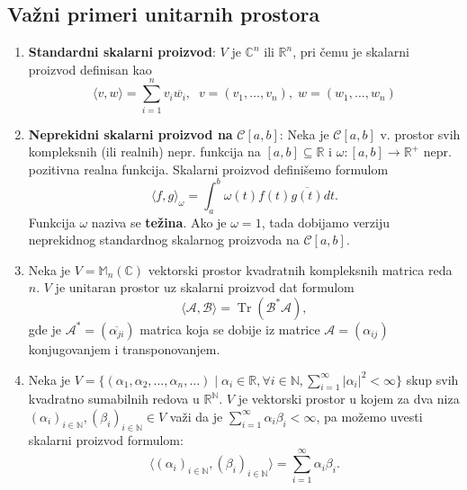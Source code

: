 \documentclass[a4paper,12pt,twoside]{report}
\numberwithin{algorithm}{section}
\begin{document}
\subsection{Važni primeri unitarnih prostora}
\begin{enumerate}
    \item \textbf{Standardni skalarni proizvod}: $V$ je $\mathbb{C}^n$ ili $\mathbb{R}^n$, pri čemu je skalarni proizvod definisan kao
    \[ \langle v, w \rangle = \sum_{i=1}^{n} v_i \overline{w_i}, \;\; v = (v_1, \dots, v_n), \; w = (w_1, \dots, w_n)\]
    \item \textbf{Neprekidni skalarni proizvod na} $\mathcal{C}[a, b]$: Neka je $\mathcal{C}[a, b]$ v. prostor svih kompleksnih (ili realnih) nepr. funkcija na $[a, b]\subseteq \mathbb{R}$ i $\omega: [a, b] \to \mathbb{R}^+$ nepr. pozitivna realna funkcija. Skalarni proizvod definišemo formulom
    \[ \langle f, g \rangle_\omega = \int_{a}^{b} \omega(t)f(t)\overline{g(t)}dt.\] 
    Funkcija $\omega$ naziva se \textbf{težina}. Ako je $\omega = 1$, tada dobijamo verziju neprekidnog standardnog skalarnog proizvoda na $\mathcal{C}[a, b]$.
    \item Neka je \( V = \mathbb{M}_n(\mathbb{C}) \) vektorski prostor kvadratnih kompleksnih matrica reda \( n \). \linebreak \( V \) je unitaran prostor uz skalarni proizvod dat formulom
\[
\langle \mathcal{A}, \mathcal{B} \rangle = \operatorname{Tr}(\mathcal{B}^*\mathcal{A}),
\]
gde je \( \mathcal{A}^* = (\overline{\alpha_{ji}}) \) matrica koja se dobije iz matrice \( \mathcal{A} = (\alpha_{ij}) \) konjugovanjem i transponovanjem.
\item Neka je \( V = \{(\alpha_1, \alpha_2, \dots, \alpha_n, \dots) \mid \alpha_i \in \mathbb{R}, \forall i \in \mathbb{N}, \sum_{i=1}^\infty |\alpha_i|^2 < \infty\} \) skup svih kvadratno sumabilnih redova u \( \mathbb{R}^\mathbb{N} \). \( V \) je vektorski prostor u kojem za dva niza \( (\alpha_i)_{i \in \mathbb{N}}, (\beta_i)_{i \in \mathbb{N}} \in V \) važi da je \( \sum_{i=1}^\infty \alpha_i \beta_i < \infty \), pa možemo uvesti skalarni proizvod formulom:
\[
\langle (\alpha_i)_{i \in \mathbb{N}}, (\beta_i)_{i \in \mathbb{N}} \rangle = \sum_{i=1}^\infty \alpha_i \beta_i.
\]
\end{enumerate}
\end{document}

